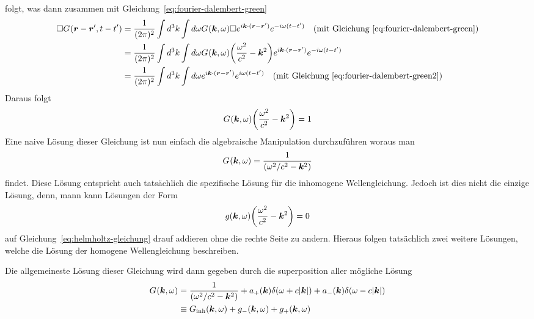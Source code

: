 folgt, was dann zusammen mit Gleichung~\ref{eq:fourier-dalembert-green}
\begin{equation}
  \begin{split}
    \Box G_{}(\vb*r-\vb*r',t-t') 
    &= 
    \frac{1}{(2\pi)^2} \int d^3k\int d\omega G_{}(\vb*k,\omega)\Box 
    e^{i\vb*k\cdot(\vb*r-\vb*r')}
    e^{-i\omega(t-t')}
    \quad(\text{mit Gleichung~\ref{eq:fourier-dalembert-green}})\\
    &=
    \frac{1}{(2\pi)^2} \int d^3k\int d\omega G_{}(\vb*k,\omega)
    \qty(\frac{\omega^2}{c^2}-\vb*k^2)
    e^{i\vb*k\cdot(\vb*r-\vb*r')}
    e^{-i\omega(t-t')}\\
    &=
    \frac{1}{(2\pi)^2} 
    \int d^3k \int d\omega e^{i\vb*k\cdot(\vb*r-\vb*r')}
    e^{i\omega(t-t')}
    \quad(\text{mit Gleichung~\ref{eq:fourier-dalembert-green2}})
  \end{split}
\end{equation}
Daraus folgt
\begin{equation}
  \label{eq:helmholtz-gleichung}
  G_{}(\vb*k,\omega) \qty(\frac{\omega^2}{c^2}-\vb*k^2) = 1
\end{equation}
Eine naive Lösung dieser Gleichung ist nun einfach die algebraische Manipulation durchzuführen woraus man
\begin{equation}
  G_{}(\vb*k,\omega) = \frac{1}{\qty(\omega^2/c^2-\vb*k^2)} 
\end{equation}
findet. Diese Lösung entspricht auch tatsächlich die spezifische Lösung für die inhomogene Wellengleichung. Jedoch ist dies nicht die einzige Lösung, denn, mann kann Lösungen der Form
\begin{equation}
  g(\vb*k, \omega)\qty(\frac{\omega^2}{c^2} -\vb*k^2)=0
\end{equation}
auf Gleichung~\ref{eq:helmholtz-gleichung} drauf addieren ohne die rechte Seite zu andern. Hieraus folgen tatsächlich zwei weitere Lösungen, welche die Lösung der homogene Wellengleichung beschreiben. 

Die allgemeineste Lösung dieser Gleichung wird dann gegeben durch die
superposition aller mögliche Lösung
\begin{equation}
  \begin{split}
  G_{}(\vb*k,\omega) 
  &= \frac{1}{\qty(\omega^2/c^2-\vb*k^2)} 
  + a_+(\vb*k)\delta(\omega+c\abs{\vb*k})
  + a_-(\vb*k)\delta(\omega-c\abs{\vb*k})\\
  &\equiv
  G_\text{inh}(\vb*k, \omega) + g_-(\vb*k, \omega) + g_+(\vb*k, \omega)
  \end{split}
\end{equation}

